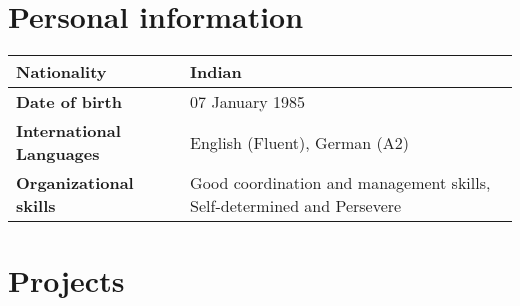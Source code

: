 \documentclass[letterpaper]{twentysecondcv} %
\begin{document}
\section{Personal information}
{
\centering
\begin{tabular}{ |p{5.2cm}|p{8.5cm}|  }
\hline
\textbf{Nationality} & Indian\\[2ex]
\hline
\textbf{Date of birth} & 07 January 1985\\[2ex]
\hline
\textbf{International Languages} & English (Fluent), German (A2)\\[2ex]
\hline
\textbf{Organizational skills} & Good coordination and management skills, \newline Self-determined and Persevere \\[2ex]
\hline
\end{tabular}
}

\newpage
\clearpage
{}

\section{Projects}
\end{document}
